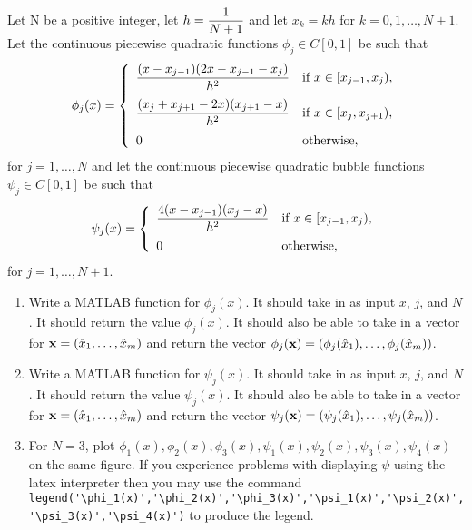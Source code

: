 
Let N be a positive integer, let $\displaystyle{h={1 \over N+1}}$ and let $x_k=kh$ for $k=0,1,\ldots,N+1$. Let the continuous piecewise quadratic functions $\phi_j\in C[0,1]$ be such that
\[
\phi_j(x)=\left\{\begin{array}{ll}
\displaystyle{{(x-x_{j-1})(2x-x_{j-1}-x_j) \over h^2}} & \displaystyle{\mbox{if }x\in[x_{j-1},x_j)},
\\[10pt]
\displaystyle{{(x_j+x_{j+1}-2x)(x_{j+1}-x) \over h^2}} & \displaystyle{\mbox{if }x\in[x_j,x_{j+1})},
\\[10pt]
0 & \mbox{otherwise},
\end{array}\right.
\]
for $j=1,\ldots,N$ and let the continuous piecewise quadratic bubble functions $\psi_j\in C[0,1]$ be such that
\[
\psi_j(x)=\left\{\begin{array}{ll}
\displaystyle{{4(x-x_{j-1})(x_j-x) \over h^2}} & \displaystyle{\mbox{if }x\in[x_{j-1},x_j)},
\\[10pt]
0 & \mbox{otherwise},
\end{array}\right.
\]
for $j=1,\ldots,N+1$.

\begin{enumerate}
\item Write a MATLAB function for $\phi_j(x)$.  It should take in as input $x$, $j$, and $N$.  It should return the value $\phi_j(x)$.  It should also be able to take in a vector for ${\bf x}=(\hat{x}_1,\ldots,\hat{x}_m)$ and return the vector $\phi_j({\bf x})=(\phi_j(\hat{x}_1),\ldots,\phi_j(\hat{x}_m))$.

\vspace*{1em}
\item Write a MATLAB function for $\psi_j(x)$.  It should take in as input $x$, $j$, and $N$.  It should return the value $\psi_j(x)$.  It should also be able to take in a vector for ${\bf x}=(\hat{x}_1,\ldots,\hat{x}_m)$ and return the vector $\psi_j({\bf x})=(\psi_j(\hat{x}_1),\ldots,\psi_j(\hat{x}_m))$.

\vspace*{1em}
\item For $N=3$, plot $\phi_1(x),\phi_2(x), \phi_3(x),\psi_1(x),\psi_2(x), \psi_3(x),\psi_4(x)$ on the same figure. If you experience problems with displaying $\psi$ using the latex interpreter then you may use the command \verb|legend('\phi_1(x)','\phi_2(x)','\phi_3(x)','\psi_1(x)','\psi_2(x)','\psi_3(x)','\psi_4(x)')| to produce the legend.
\end{enumerate}


